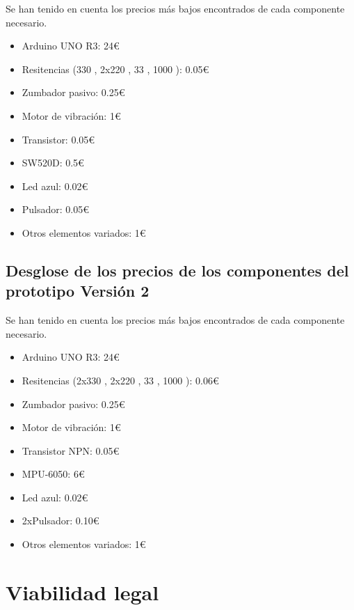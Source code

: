 Se han tenido en cuenta los precios más bajos encontrados de cada componente necesario.
\begin{itemize}
    \item Arduino UNO R3: 24€
    \item Resitencias (330 \textOmega, 2x220 \textOmega, 33 \textOmega, 1000 \textOmega): 0.05€
    \item Zumbador pasivo: 0.25€
    \item Motor de vibración: 1€
    \item Transistor: 0.05€
    \item SW520D: 0.5€
    \item Led azul: 0.02€
    \item Pulsador: 0.05€
    \item Otros elementos variados: 1€
    
\end{itemize}

\subsection{Desglose de los precios de los componentes del prototipo Versión 2}

Se han tenido en cuenta los precios más bajos encontrados de cada componente necesario.
\begin{itemize}
    \item Arduino UNO R3: 24€
    \item Resitencias (2x330 \textOmega, 2x220 \textOmega, 33 \textOmega, 1000 \textOmega): 0.06€
    \item Zumbador pasivo: 0.25€
    \item Motor de vibración: 1€
    \item Transistor NPN: 0.05€
    \item MPU-6050: 6€
    \item Led azul: 0.02€
    \item 2xPulsador: 0.10€
    \item Otros elementos variados: 1€
    
\end{itemize}




\section{Viabilidad legal}

